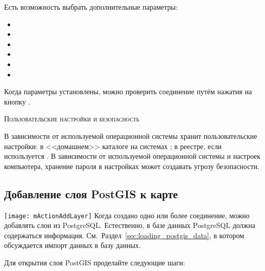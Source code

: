 Есть возможность выбрать дополнительные параметры:

\begin{itemize}[label=--]
\item {}
\item {}
\item {}
\item {}
\item {}
\item {}
\end{itemize}

Когда параметры установлены, можно проверить соединение путём нажатия
на кнопку  .

\begin{Tip}\caption{\textsc{\qg Пользовательские настройки и безопасность}}
В зависимости от используемой операционной системы \qg хранит
пользовательские настройки: в <<домашнем>> каталоге на \nix системах
; в реестре, если используется \win. В зависимости
от используемой операционной системы и настроек компьютера, хранение пароля
в настройках \qg может создавать угрозу безопасности.
\end{Tip}

\subsection{Добавление слоя PostGIS к карте}

\texttt{[image: mActionAddLayer]} Когда создано одно или
более соединение, можно добавлять слои из PostgreSQL. Естественно, в базе
данных PostgreSQL должна содержаться
информация. См.~Раздел~\ref{sec:loading_postgis_data}, в котором
обсуждается импорт данных в базу данных.

Для открытия слоя PostGIS проделайте следующие шаги:

